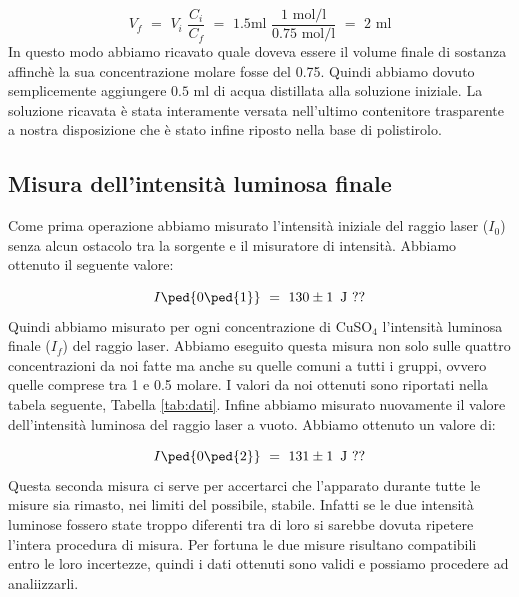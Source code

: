\begin{equation*}
	V_f \,\, = \,\, V_i \,\, \frac{C_i}{C_f} \,\, = \,\, 1.5 \si{\milli\litre} \,\, \frac{1 \,\, \si{\mole\per\litre}}{0.75 \,\, \si{\mole\per\litre}} \,\, = \,\, 2 \,\, \si{\milli\litre}
\end{equation*}
%
In questo modo abbiamo ricavato quale doveva essere il volume finale di sostanza affinchè la sua concentrazione molare fosse del 0.75. Quindi abbiamo dovuto semplicemente aggiungere $0.5\,\,\si{\milli\litre}$ di acqua distillata alla soluzione iniziale.
La soluzione ricavata è stata interamente versata nell'ultimo contenitore trasparente a nostra disposizione che è stato infine riposto nella base di polistirolo.

\subsection{Misura dell'intensità luminosa finale}

Come prima operazione abbiamo misurato l'intensità iniziale del raggio laser ($I_0$) senza alcun ostacolo tra la sorgente e il misuratore di intensità. Abbiamo ottenuto il seguente valore:

\begin{equation*}
	I\ped{0\ped{1}} \,\,=\,\, 130 \pm 1 \,\,\, \si{\joule} \,\, ??
\end{equation*}
%
Quindi abbiamo misurato per ogni concentrazione di CuSO$_4$ l'intensità luminosa finale ($I_f$) del raggio laser. Abbiamo eseguito questa misura non solo sulle quattro concentrazioni da noi fatte ma anche su quelle comuni a tutti i gruppi, ovvero quelle comprese tra 1 e 0.5 molare. I valori da noi ottenuti sono riportati nella tabela seguente, Tabella \ref{tab:dati}.
Infine abbiamo misurato nuovamente il valore dell'intensità luminosa del raggio laser a vuoto. Abbiamo ottenuto un valore di:

\begin{equation*}
	I\ped{0\ped{2}} \,\,=\,\, 131 \pm 1 \,\,\, \si{\joule} \,\, ??
\end{equation*}
%
Questa seconda misura ci serve per accertarci che l'apparato durante tutte le misure sia rimasto, nei limiti del possibile, stabile. Infatti se le due intensità luminose fossero state troppo diferenti tra di loro si sarebbe dovuta ripetere l'intera procedura di misura. Per fortuna le due misure risultano compatibili entro le loro incertezze, quindi i dati ottenuti sono validi e possiamo procedere ad analiizzarli.

